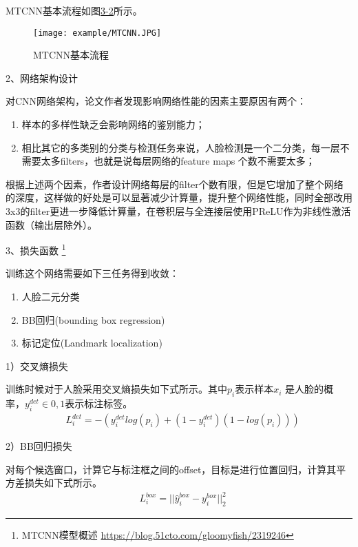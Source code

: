 MTCNN基本流程如图\href{figure:3-2}{3-2}所示。

\begin{figure}[!htp]

\centering
\texttt{[image: example/MTCNN.JPG]}
\caption{MTCNN基本流程}
\label{figure:3-2}

\end{figure}

2、网络架构设计

对CNN网络架构，论文作者发现影响网络性能的因素主要原因有两个：
\begin{enumerate}[label=\circled{\arabic*}]
    \item 样本的多样性缺乏会影响网络的鉴别能力；
    \item 相比其它的多类别的分类与检测任务来说，人脸检测是一个二分类，每一层不需要太多filters，也就是说每层网络的feature maps 个数不需要太多；
\end{enumerate}
根据上述两个因素，作者设计网络每层的filter个数有限，但是它增加了整个网络的深度，这样做的好处是可以显著减少计算量，提升整个网络性能，同时全部改用3x3的filter更进一步降低计算量，在卷积层与全连接层使用PReLU作为非线性激活函数（输出层除外）。

3、损失函数 \footnote{MTCNN模型概述 \quad \url{https://blog.51cto.com/gloomyfish/2319246}}

训练这个网络需要如下三任务得到收敛：
\begin{enumerate}[label=\circled{\arabic*}]
    \item 人脸二元分类
    \item BB回归(bounding box regression)
    \item 标记定位(Landmark localization)
\end{enumerate}

1）交叉熵损失

训练时候对于人脸采用交叉熵损失如下式所示。其中$p_i$表示样本$x_i$ 是人脸的概率，$y_i^{det} \in {0,1}$表示标注标签。
\begin{align}
& L_i^{det} = -(y_i^{det} log(p_i) + (1 - y_i^{det})(1 - log(p_i)))
\end{align}

2）BB回归损失

对每个候选窗口，计算它与标注框之间的offset，目标是进行位置回归，计算其平方差损失如下式所示。
\begin{align}
& L_i^{box} = ||\hat{y}_i^{box} - y_i^{box}||_2^2
\end{align}

